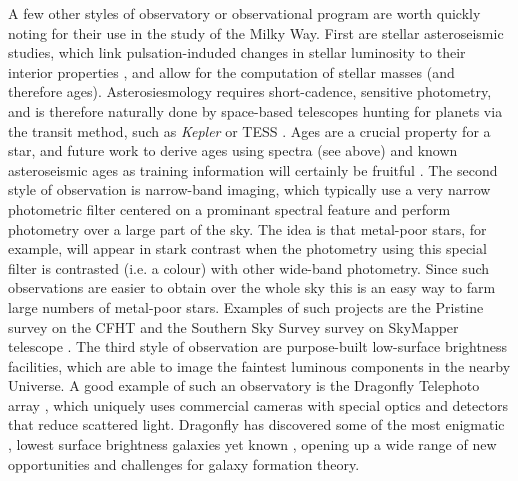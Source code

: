A few other styles of observatory or observational program are worth quickly noting for their use in the study of the Milky Way. First are stellar asteroseismic studies, which link pulsation-induded changes in stellar luminosity to their interior properties \parencite[see][for a review]{kurtz22}, and allow for the computation of stellar masses (and therefore ages). Asterosiesmology requires short-cadence, sensitive photometry, and is therefore naturally done by space-based telescopes hunting for planets via the transit method, such as \textit{Kepler} \parencite{kepler} or TESS \parencite{tess}. Ages are a crucial property for a star, and future work to derive ages using spectra (see above) and known asteroseismic ages as training information will certainly be fruitful \parencite[e.g. see][]{montalban21}. The second style of observation is narrow-band imaging, which typically use a very narrow photometric filter centered on a prominant spectral feature and perform photometry over a large part of the sky. The idea is that metal-poor stars, for example, will appear in stark contrast when the photometry using this special filter is contrasted (i.e. a colour) with other wide-band photometry. Since such observations are easier to obtain over the whole sky this is an easy way to farm large numbers of metal-poor stars. Examples of such projects are the Pristine survey on the CFHT \parencite{pristine} and the Southern Sky Survey survey on SkyMapper telescope \parencite{skymapperdr1}. The third style of observation are purpose-built low-surface brightness facilities, which are able to image the faintest luminous components in the nearby Universe. A good example of such an observatory is the Dragonfly Telephoto array \parencite{dragonfly}, which uniquely uses commercial cameras with special optics and detectors that reduce scattered light. Dragonfly has discovered some of the most enigmatic \parencite[i.e. both lacking, and being completely dominated by dark matter][]{vandokkum16,vandokkum18}, lowest surface brightness galaxies yet known \parencite{vandokkum15}, opening up a wide range of new opportunities and challenges for galaxy formation theory.

